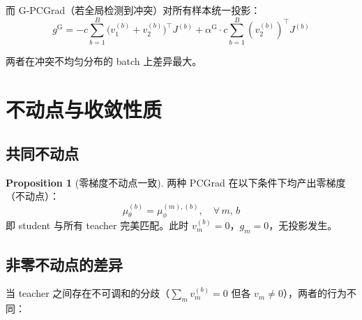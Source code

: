 \documentclass[11pt,a4paper]{article}
\newcommand{\mutheta}{\mu_\theta}
\newcommand{\muphi}{\mu_\phi}
\theoremstyle{definition}
\newtheorem{proposition}{Proposition}
\begin{document}
而 G-PCGrad（若全局检测到冲突）对所有样本统一投影：
\begin{equation}
g^{\mathrm{G}} = -c\sum_{b=1}^B \bigl(v_1^{(b)} + v_2^{(b)}\bigr)^\top J^{(b)}
+ \alpha^{\mathrm{G}} \cdot c\sum_{b=1}^B (v_2^{(b)})^\top J^{(b)}
\end{equation}

两者在冲突不均匀分布的 batch 上差异最大。

\section{不动点与收敛性质}
\label{sec:fixed_point}

\subsection{共同不动点}

\begin{proposition}[零梯度不动点一致]
两种 PCGrad 在以下条件下均产出零梯度（不动点）：
\begin{equation}
\mutheta^{(b)} = \muphi^{(m),(b)}, \quad \forall\, m,\, b
\end{equation}
即 student 与所有 teacher 完美匹配。此时 $v_m^{(b)} = 0$，$g_m = 0$，无投影发生。
\end{proposition}

\subsection{非零不动点的差异}

当 teacher 之间存在不可调和的分歧（$\sum_m v_m^{(b)} = 0$ 但各 $v_m \neq 0$），两者的行为不同：
\end{document}

